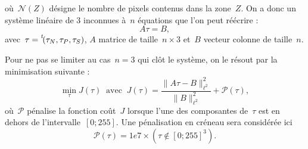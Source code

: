 \documentclass[main.tex]{subfiles}
\begin{document}
où~$\mathcal{N}(Z)$ désigne le nombre de pixels contenus dans la zone~$Z$. On a donc un système linéaire de 3 inconnues à~$n$ équations que l'on peut réécrire :
\begin{equation} \label{eq:Atau_egal_B}
A\tau=B,
\end{equation}
avec~$\tau= \prescript{\mathit{t\!}}{}{(}\tau_N,\tau_P,\tau_S)$, $A$ matrice de taille~$n\times 3$ et~$B$ vecteur colonne de taille~$n$.

Pour ne pas se limiter au cas~$n=3$ qui clôt le système, on le résout par la minimisation suivante :
\begin{equation}\label{eq:min_optim_grey}
\min_{\tau} J(\tau) \ \textrm{ avec } \ J(\tau)= \dfrac{\| A\tau - B \|^2_{\ell^2}}{\|B\|^2_{\ell^2}} + \mathcal{P}(\tau),
\end{equation}
où~$\mathcal{P}$ pénalise la fonction coût~$J$ lorsque l'une des composantes de~$\tau$ est en dehors de l'intervalle~$[0;255]$. 
Une pénalisation en créneau sera considérée ici
\begin{equation}
\label{eq:penalisation_creneau}
\mathcal{P}(\tau) = 1e7 \times ( \tau \notin  [0;255]^3 ).
\end{equation}
\end{document}
